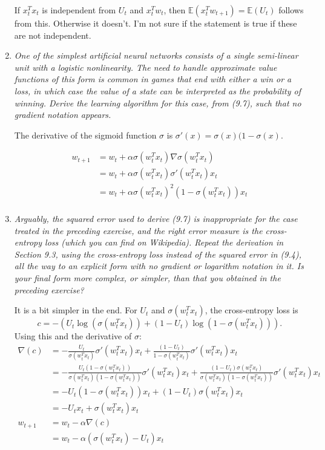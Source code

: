 \documentclass[12pt,a4paper]{article}
\begin{document}
\begin{enumerate}
  If $x_t^T x_t$ is independent from $U_t$ and $x_t^Tw_t$, then $\mathbb{E}(x_t^Tw_{t + 1}) = \mathbb{E}(U_t)$
  follows from this. Otherwise it doesn't. I'm not sure if the statement is true if
  these are not independent.

  \item \textit{One of the simplest artificial neural networks consists of a single semi-linear
  unit with a logistic nonlinearity. The need to handle approximate value functions of this
  form is common in games that end with either a win or a loss, in which case the value of
  a state can be interpreted as the probability of winning. Derive the learning algorithm
  for this case, from (9.7), such that no gradient notation appears.}

  The derivative of the sigmoid function $\sigma$ is $\sigma'(x) = \sigma(x)
  (1 - \sigma(x)$.

  \begin{align*}
    w_{t + 1} &= w_t + \alpha\sigma(w_t^Tx_t) \nabla \sigma(w_t^Tx_t)\\
    &= w_t + \alpha \sigma(w_t^Tx_t) \sigma'(w_t^Tx_t) x_t \\
    &= w_t + \alpha \sigma(w_t^Tx_t)^2(1 - \sigma(w_t^Tx_t)) x_t \\
  \end{align*}

  \item \textit{Arguably, the squared error used to derive (9.7) is inappropriate for the
  case treated in the preceding exercise, and the right error measure is the cross-entropy
  loss (which you can find on Wikipedia). Repeat the derivation in Section 9.3, using the
  cross-entropy loss instead of the squared error in (9.4), all the way to an explicit form
  with no gradient or logarithm notation in it. Is your final form more complex, or simpler,
  than that you obtained in the preceding exercise?}

  It is a bit simpler in the end. For $U_t$ and $\sigma(w_t^Tx_t)$, the cross-entropy loss is
  \[c = -(U_t \log(\sigma(w_t^Tx_t)) + (1 - U_t)\log(1 - \sigma(w_t^Tx_t))).\]
  Using this and the derivative of $\sigma$:
  \begin{align*}
    \nabla(c) &= -\frac{U_t}{\sigma(w_t^Tx_t)}\sigma'(w_t^Tx_t)x_t
    + \frac{(1 - U_t)}{1 - \sigma(w_t^Tx_t)}\sigma'(w_t^Tx_t)x_t\\
    &= -\frac{U_t(1 - \sigma(w_t^Tx_t))}{\sigma(w_t^Tx_t)(1 - \sigma(w_t^Tx_t))}
    \sigma'(w_t^Tx_t)x_t
    + \frac{(1 - U_t)\sigma(w_t^Tx_t)}{\sigma(w_t^Tx_t)(1 - \sigma(w_t^Tx_t))}
    \sigma'(w_t^Tx_t)x_t\\
    &= -U_t(1 - \sigma(w_t^Tx_t))x_t + (1 - U_t)\sigma(w_t^Tx_t)x_t\\
    &= -U_t x_t + \sigma(w_t^T x_t)x_t\\
    w_{t + 1} &= w_t - \alpha \nabla(c)\\
    &= w_t - \alpha(\sigma(w_t^T x_t) - U_t)x_t\\
  \end{align*}

\end{enumerate}
\end{document}
